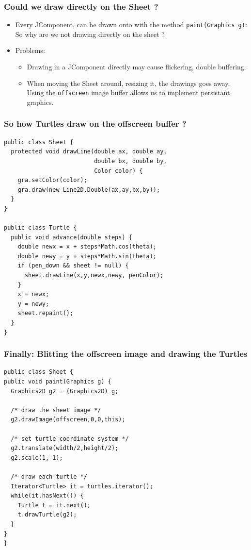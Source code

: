 \documentclass[10pt, handout]{beamer}
\begin{document}
\begin{frame}
  \frametitle{Could we draw directly on the Sheet ?}
  \begin{itemize}
    \item Every JComponent, can be drawn onto with the method
      \texttt{paint(Graphics g)}: So why are we not drawing directly
      on the sheet ?
    \item Problems:
      \begin{itemize}
      \item \alert{Drawing in a JComponent directly may cause flickering,
          double buffering.}
      \item \alert{When moving the Sheet around, resizing it, the drawings
        goes away. Using the \texttt{offscreen} image buffer allows us to
        implement persistant graphics.}
      \end{itemize}
  \end{itemize}
\end{frame}

\begin{frame}
  \frametitle{So how Turtles draw on the offscreen buffer ?}
\begin{verbatim}
public class Sheet {
  protected void drawLine(double ax, double ay,
                          double bx, double by,
                          Color color) {
    gra.setColor(color);
    gra.draw(new Line2D.Double(ax,ay,bx,by));
  }
}

public class Turtle {
  public void advance(double steps) {
    double newx = x + steps*Math.cos(theta);
    double newy = y + steps*Math.sin(theta);
    if (pen_down && sheet != null) {
      sheet.drawLine(x,y,newx,newy, penColor);
    }
    x = newx;
    y = newy;
    sheet.repaint();
  }
}
\end{verbatim}
\end{frame}

\begin{frame}
  \frametitle{Finally: Blitting the offscreen image and drawing the Turtles}
\begin{verbatim}
public class Sheet {
public void paint(Graphics g) {
  Graphics2D g2 = (Graphics2D) g;

  /* draw the sheet image */
  g2.drawImage(offscreen,0,0,this);

  /* set turtle coordinate system */
  g2.translate(width/2,height/2);
  g2.scale(1,-1);

  /* draw each turtle */
  Iterator<Turtle> it = turtles.iterator();
  while(it.hasNext()) {
    Turtle t = it.next();
    t.drawTurtle(g2);
  }
}
}
\end{verbatim}
\end{frame}
\end{document}
